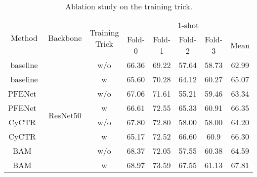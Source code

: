 \documentclass{article}
\begin{document}
\begin{table}[h]\scriptsize
\centering
\setlength\tabcolsep{4pt}
\renewcommand\arraystretch{1.3}
\caption{Ablation study on the training trick.}
\label{tab:datsets}
\begin{tabular}{c|c|c|ccccc}
\hline
\multirow{2}{*}{Method} & \multirow{2}{*}{Backbone} & \multirow{2}{*}{Training Trick} & \multicolumn{5}{c}{1-shot}                                    \\ \cline{4-8} 
                        &                           &                          & Fold-0 & Fold-1 & Fold-2 & \multicolumn{1}{c|}{Fold-3} & Mean  \\ \hline
baseline                & \multirow{8}{*}{ResNet50} & w/o                        & 66.36  & 69.22  & 57.64  & \multicolumn{1}{c|}{58.73}  & 62.99 \\
baseline                &                           & w                        & 65.60  & 70.28  & 64.12  & \multicolumn{1}{c|}{60.27}  & 65.07 \\ \cline{1-1} \cline{3-8} 
PFENet~\cite{tian2020prior}                  &                           & w/o                        &67.06        & 71.61       & 55.21       &  \multicolumn{1}{c|}{59.46}       & 63.34      \\
PFENet~\cite{tian2020prior}                   &                           & w                        & 66.61  & 72.55  & 65.33  & \multicolumn{1}{c|}{60.91}  & 66.35  \\ \cline{1-1} \cline{3-8} 
CyCTR~\cite{zhang2021few}                   &                           & w/o                        & 67.80  & 72.80  & 58.00  & \multicolumn{1}{c|}{58.00}  & 64.20 \\
CyCTR~\cite{zhang2021few}                   &                           & w                        & 65.17  & 72.52  & 66.60  & \multicolumn{1}{c|}{60.9}   & 66.30 \\ \cline{1-1} \cline{3-8} 
BAM~\cite{lang2022learning}                     &                           & w/o                        & 68.37  & 72.05  & 57.55  & \multicolumn{1}{c|}{60.38}  & 64.59 \\
BAM~\cite{lang2022learning}                     &                           & w                        & 68.97  & 73.59  & 67.55  & \multicolumn{1}{c|}{61.13}  & 67.81 \\ \hline
\end{tabular}
\vspace{-2.0em}
\end{table}
\end{document}
